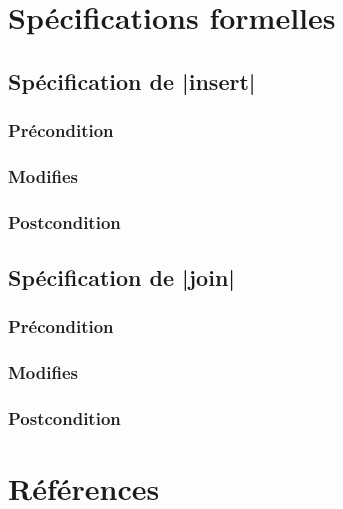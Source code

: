 \documentclass{elsarticle}
\begin{document}
\section{Spécifications formelles}
\subsection{Spécification de \inlinedafny|insert|}
\subsubsection{Précondition}

\subsubsection{Modifies}

\subsubsection{Postcondition}

\subsection{Spécification de \inlinedafny|join|}
\subsubsection{Précondition}

\subsubsection{Modifies}

\subsubsection{Postcondition}


\section*{Références}


\end{document}
